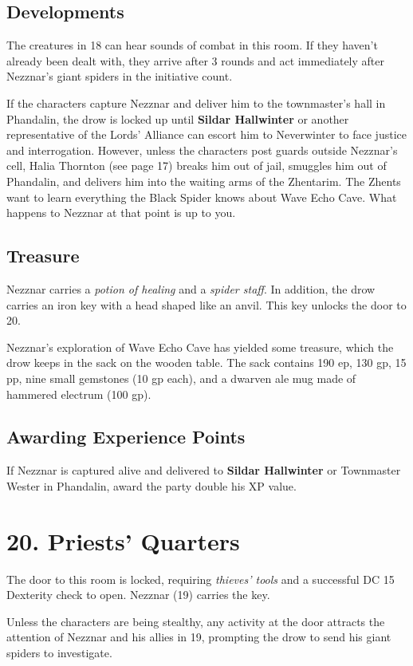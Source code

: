 \documentclass[10pt,a4paper,twoside,bg=print,twocolumn,openany,nodeprecatedcode]{dndbook}
\begin{document}
\subsection{Developments}
The creatures in 18 can hear sounds of combat in this room. If they haven't already been dealt with, they arrive after 3 rounds and act immediately after Nezznar's giant spiders in the initiative count.

If the characters capture Nezznar and deliver him to the townmaster's hall in Phandalin, the drow is locked up until \textbf{Sildar Hallwinter} or another representative of the Lords' Alliance can escort him to Neverwinter to face justice and interrogation. However, unless the characters post guards outside Nezznar's cell, Halia Thornton (see page 17) breaks him out of jail, smuggles him out of Phandalin, and delivers him into the waiting arms of the Zhentarim. The Zhents want to learn everything the Black Spider knows about Wave Echo Cave. What happens to Nezznar at that point is up to you.

\subsection{Treasure}
Nezznar carries a \textit{potion of healing} and a \textit{spider staff}. In addition, the drow carries an iron key with a head shaped like an anvil. This key unlocks the door to 20.

Nezznar's exploration of Wave Echo Cave has yielded some treasure, which the drow keeps in the sack on the wooden table. The sack contains 190 ep, 130 gp, 15 pp, nine small gemstones (10 gp each), and a dwarven ale mug made of hammered electrum (100 gp).

\subsection{Awarding Experience Points}
If Nezznar is captured alive and delivered to \textbf{Sildar Hallwinter} or Townmaster Wester in Phandalin, award the party double his XP value.

\section{20. Priests' Quarters}
The door to this room is locked, requiring \textit{thieves' tools} and a successful DC 15 Dexterity check to open. Nezznar (19) carries the key.

Unless the characters are being stealthy, any activity at the door attracts the attention of Nezznar and his allies in 19, prompting the drow to send his giant spiders to investigate.
\end{document}
